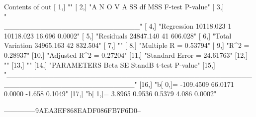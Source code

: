Contents of out
[ 1,] ""
[ 2,] "A  N  O  V  A                   SS      df     MSS       F-test   P-value"
[ 3,] "_________________________________________________________________________"
[ 4,] "Regression                 10118.023     1 10118.023      16.696   0.0002"
[ 5,] "Residuals                  24847.140    41   606.028"
[ 6,] "Total Variation            34965.163    42   832.504"
[ 7,] ""
[ 8,] "Multiple R      = 0.53794"
[ 9,] "R^2             = 0.28937"
[10,] "Adjusted R^2    = 0.27204"
[11,] "Standard Error  = 24.61763"
[12,] ""
[13,] ""
[14,] "PARAMETERS         Beta         SE         StandB        t-test   P-value"
[15,] "________________________________________________________________________"
[16,] "b[ 0,]=       -109.4509      66.0171       0.0000        -1.658   0.1049"
[17,] "b[ 1,]=          3.8965       0.9536       0.5379         4.086   0.0002"








--------------9AEA3EF868EADF086FB7F6D0--

